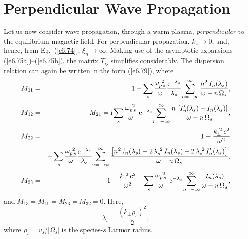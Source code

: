 \section{Perpendicular Wave Propagation}
Let us now consider wave propagation, through a warm plasma, {\em perpendicular}\/ 
to the equilibrium magnetic field. For perpendicular propagation, $k_z\rightarrow 0$,
and, hence, from Eq.~(\ref{e6.74}), $\xi_n\rightarrow \infty$. Making use of
the asymptotic expansions (\ref{e6.75a})--(\ref{e6.75b}), the matrix $T_{ij}$ simplifies
considerably. The dispersion relation can again be written
in the form (\ref{e6.79}), where
\begin{eqnarray}\label{e6.86a}
M_{11} &=& 1 - \sum_s\frac{\omega_{p\,s}^{~2}}{\omega}
\frac{{\rm e}^{-\lambda_s}}{\lambda_s} \!\sum_{n=-\infty}^\infty \frac{n^2\,I_n(
\lambda_s)}{\omega-n\,{\Omega}_s},\\[0.5ex]
M_{12} &=& -M_{21} = {\rm i}\sum_s \frac{\omega_{p\,s}^{~2}}{\omega}
\,\,{\rm e}^{-\lambda_s}\! \sum_{n=-\infty}^\infty \frac{n\,\left[I_n'(\lambda_s)
-I_n(\lambda_s)\right]}{\omega-n\,{\Omega}_s},\\[0.5ex]
M_{22} &=& 1 -\frac{k_\perp^{~2}\,c^2}{\omega^2} \\[0.5ex]
&&
- \sum_s \frac{\omega_{p\,s}^{~2}}{\omega} \frac{{\rm e}^{-\lambda_s}}{\lambda_s}\!
\sum_{n=-\infty}^\infty \frac{\left[n^2\,I_n(\lambda_s) +2 \,\lambda_s^{~2}\,
I_n(\lambda_s) - 2\,\lambda_s^{~2}\,I_n'(\lambda_s)\right]}{\omega-n\,{\Omega}_s},\nonumber
\\[0.5ex]
M_{33} &=& 1 - \frac{k_\perp^{~2}\,c^2}{\omega^2} - \!
\sum_s \frac{\omega_{p\,s}^{~2}}{\omega}\,\,
{\rm e}^{-\lambda_s} \!\sum_{n=-\infty}^\infty
\frac{I_n(\lambda_s)}{\omega-n\,{\Omega}_s},\label{e6.86d}
\end{eqnarray}
and $M_{13} = M_{31} = M_{23}=M_{32}=0$.
Here, 
\begin{equation}\label{e6.87}
\lambda_s = \frac{(k_\perp \rho_s)^2}{2},
\end{equation}
where $\rho_s=v_s/|{\Omega}_s|$ is the species-$s$ Larmor radius.

